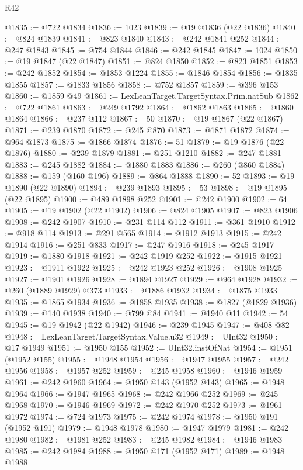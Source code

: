 \begin{lexlean}{R42}
\begin{coremodule}
{@1835 := @722 @1834
@1836 := 1023
@1839 := @19 @1836 (@22 @1836)
@1840 := @824 @1839
@1841 := @823 @1840
@1843 := @242 @1841 @252
@1844 := @247 @1843
@1845 := @754 @1844
@1846 := @242 @1845
@1847 := 1024
@1850 := @19 @1847 (@22 @1847)
@1851 := @824 @1850
@1852 := @823 @1851
@1853 := @242 @1852
@1854 := @1853 @1224
@1855 := @1846 @1854
@1856 := @1835 @1855
@1857 := @1833 @1856
@1858 := @752 @1857
@1859 := @396 @153
@1860 := @1859 @49
@1861 := LexLeanTarget.TargetSyntax.Prim.natSub
@1862 := @722 @1861
@1863 := @249 @1792
@1864 := @1862 @1863
@1865 := @1860 @1864
@1866 := @237 @112
@1867 := 50
@1870 := @19 @1867 (@22 @1867)
@1871 := @239 @1870
@1872 := @245 @870
@1873 := @1871 @1872
@1874 := @964 @1873
@1875 := @1866 @1874
@1876 := 51
@1879 := @19 @1876 (@22 @1876)
@1880 := @239 @1879
@1881 := @251 @1210
@1882 := @247 @1881
@1883 := @245 @1882
@1884 := @1880 @1883
@1886 := @260 (@860 @1884)
@1888 := @159 (@160 @196)
@1889 := @864 @1888
@1890 := 52
@1893 := @19 @1890 (@22 @1890)
@1894 := @239 @1893
@1895 := 53
@1898 := @19 @1895 (@22 @1895)
@1900 := @489 @1898 @252
@1901 := @242 @1900
@1902 := 64
@1905 := @19 @1902 (@22 @1902)
@1906 := @824 @1905
@1907 := @823 @1906
@1908 := @242 @1907
@1910 := @231 @114 @112
@1911 := @361 @1910
@1912 := @918 @114
@1913 := @291 @565
@1914 := @1912 @1913
@1915 := @242 @1914
@1916 := @251 @833
@1917 := @247 @1916
@1918 := @245 @1917
@1919 := @1880 @1918
@1921 := @242 @1919 @252
@1922 := @1915 @1921
@1923 := @1911 @1922
@1925 := @242 @1923 @252
@1926 := @1908 @1925
@1927 := @1901 @1926
@1928 := @1894 @1927
@1929 := @964 @1928
@1932 := @260 (@1889 @1929) @373
@1933 := @1886 @1932
@1934 := @1875 @1933
@1935 := @1865 @1934
@1936 := @1858 @1935
@1938 := @1827 (@1829 @1936)
@1939 := @140 @1938
@1940 := @799 @84
@1941 := @1940 @11
@1942 := 54
@1945 := @19 @1942 (@22 @1942)
@1946 := @239 @1945
@1947 := @408 @82
@1948 := LexLeanTarget.TargetSyntax.Value.u32
@1949 := UInt32
@1950 := @17 @1949
@1951 := @1950 @155
@1952 := UInt32.instOfNat
@1954 := @1951 (@1952 @155)
@1955 := @1948 @1954
@1956 := @1947 @1955
@1957 := @242 @1956
@1958 := @1957 @252
@1959 := @245 @1958
@1960 := @1946 @1959
@1961 := @242 @1960
@1964 := @1950 @143 (@1952 @143)
@1965 := @1948 @1964
@1966 := @1947 @1965
@1968 := @242 @1966 @252
@1969 := @245 @1968
@1970 := @1946 @1969
@1972 := @242 @1970 @252
@1973 := @1961 @1972
@1974 := @724 @1973
@1975 := @242 @1974
@1978 := @1950 @191 (@1952 @191)
@1979 := @1948 @1978
@1980 := @1947 @1979
@1981 := @242 @1980
@1982 := @1981 @252
@1983 := @245 @1982
@1984 := @1946 @1983
@1985 := @242 @1984
@1988 := @1950 @171 (@1952 @171)
@1989 := @1948 @1988
}
\end{coremodule}
\end{lexlean}
